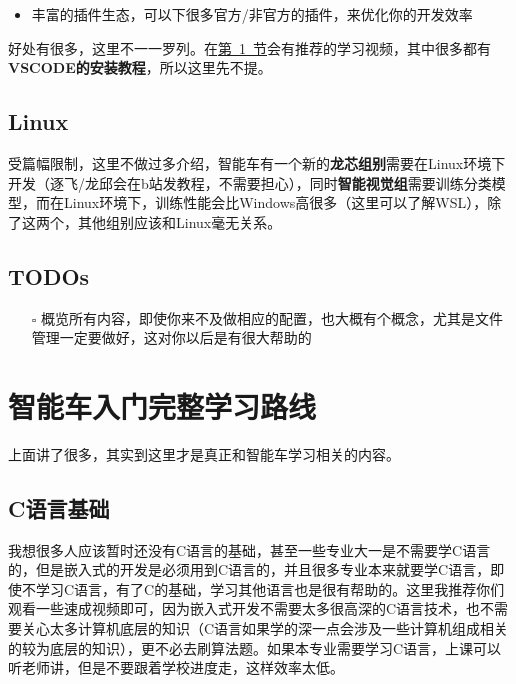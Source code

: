 \documentclass[a4paper,12pt]{article}
\begin{document}
\begin{itemize}
    \item 丰富的插件生态，可以下很多官方/非官方的插件，来优化你的开发效率
\end{itemize}

好处有很多，这里不一一罗列。在\hyperref[sec:learning-path]{第~\ref*{sec:learning-path}~节}会有推荐的学习视频，其中很多都有\textbf{VSCODE的安装教程}，所以这里先不提。

\subsection{Linux}

受篇幅限制，这里不做过多介绍，智能车有一个新的\textbf{龙芯组别}需要在Linux环境下开发（逐飞/龙邱会在b站发教程，不需要担心），同时\textbf{智能视觉组}需要训练分类模型，而在Linux环境下，训练性能会比Windows高很多（这里可以了解WSL），除了这两个，其他组别应该和Linux毫无关系。

\subsection{TODOs}

\begin{todobox}
\begin{itemize}
    \item[$\square$] 概览所有内容，即使你来不及做相应的配置，也大概有个概念，尤其是文件管理一定要做好，这对你以后是有很大帮助的
\end{itemize}
\end{todobox}

\section{智能车入门完整学习路线}
\label{sec:learning-path}

上面讲了很多，其实到这里才是真正和智能车学习相关的内容。

\subsection{C语言基础}

我想很多人应该暂时还没有C语言的基础，甚至一些专业大一是不需要学C语言的，但是嵌入式的开发是必须用到C语言的，并且很多专业本来就要学C语言，即使不学习C语言，有了C的基础，学习其他语言也是很有帮助的。这里我推荐你们观看一些速成视频即可，因为嵌入式开发不需要太多很高深的C语言技术，也不需要关心太多计算机底层的知识（C语言如果学的深一点会涉及一些计算机组成相关的较为底层的知识），更不必去刷算法题。如果本专业需要学习C语言，上课可以听老师讲，但是不要跟着学校进度走，这样效率太低。
\end{document}
